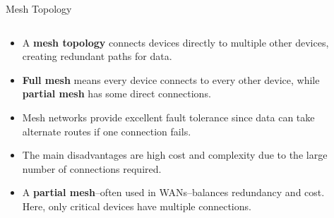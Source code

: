 \documentclass[aspectratio=169]{beamer}
\begin{document}
\begin{frame}{Mesh Topology}

\begin{columns}
\begin{column}{0.7\textwidth}
\begin{itemize}
    \item A \textbf{mesh topology} connects devices directly to multiple other devices, creating redundant paths for data.
    \item \textbf{Full mesh} means every device connects to every other device, while \textbf{partial mesh} has some direct connections.
    \item Mesh networks provide excellent fault tolerance since data can take alternate routes if one connection fails.
    \item The main disadvantages are high cost and complexity due to the large number of connections required.
    \item A \textbf{partial mesh}--often used in WANs--balances redundancy and cost. Here, only critical devices have multiple connections.
\end{itemize}
\end{column}

\begin{column}{0.3\textwidth}
\centering
{}
\end{column}
\end{columns}

\end{frame}
\end{document}

